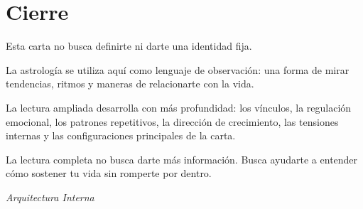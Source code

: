 \documentclass[11pt,a4paper]{article}
\begin{document}

\section{Cierre}

Esta carta no busca definirte ni darte una identidad fija.

La astrología se utiliza aquí como lenguaje de observación:
una forma de mirar tendencias, ritmos y maneras de relacionarte con la vida.

La lectura ampliada desarrolla con más profundidad:
los vínculos,
la regulación emocional,
los patrones repetitivos,
la dirección de crecimiento,
las tensiones internas
y las configuraciones principales de la carta.

La lectura completa no busca darte más información.
Busca ayudarte a entender cómo sostener tu vida sin romperte por dentro.

\vspace{1cm}

\begin{center}

{\small\itshape\color{grisai}
Arquitectura Interna
}

\end{center}
\end{document}

